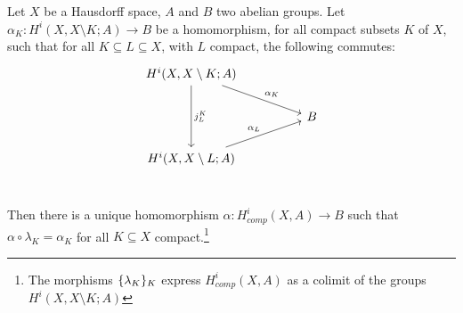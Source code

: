 \documentclass[language=english]{TemplateLecture}
\begin{document}
\begin{proposition}
    Let \(X\) be a Hausdorff space, \(A\) and \(B\) two abelian groups. Let \(\alpha_K\colon H^i(X, X\setminus K;A ) \to B\) be a homomorphism, for all compact subsets \(K\) of \(X\), such that for all \(K \subseteq L \subseteq X\), with \(L\) compact, the following commutes:
    \[\begin{tikzcd}
        {H^i(X, X\setminus K; A)} \ar[rrd, "\alpha_K"] \ar[dd, "j_L^K"] & & \\
    & & B \\
    {H^i(X, X \setminus L; A)} \ar[rru, "\alpha_L"] & & \\
    \end{tikzcd}\]

    Then there is a unique homomorphism \(\alpha\colon H^i_{comp}(X,A) \to B\) such that \(\alpha \circ \lambda_K = \alpha_K\) for all \(K \subseteq X\) compact.\footnote{The morphisms \(\{\lambda_K\}_K\) express \(H_{comp}^i(X,A)\) as a colimit of the groups \(H^i(X, X\setminus K; A)\)}
\end{proposition}
\end{document}
